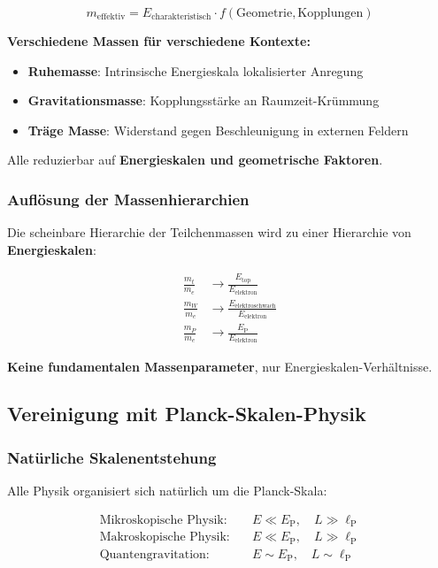 \documentclass[12pt,a4paper]{article}
\newcommand{\lP}{\ell_{\text{P}}}
\newcommand{\EP}{E_{\text{P}}}
\begin{document}
	\begin{equation}
		m_{\text{effektiv}} = E_{\text{charakteristisch}} \cdot f(\text{Geometrie}, \text{Kopplungen})
		\label{eq:emergent_mass}
	\end{equation}
	
	\textbf{Verschiedene Massen für verschiedene Kontexte:}
	\begin{itemize}
		\item \textbf{Ruhemasse}: Intrinsische Energieskala lokalisierter Anregung
		\item \textbf{Gravitationsmasse}: Kopplungsstärke an Raumzeit-Krümmung  
		\item \textbf{Träge Masse}: Widerstand gegen Beschleunigung in externen Feldern
	\end{itemize}
	
	Alle reduzierbar auf \textbf{Energieskalen und geometrische Faktoren}.
	
	\subsubsection{Auflösung der Massenhierarchien}
	
	Die scheinbare Hierarchie der Teilchenmassen wird zu einer Hierarchie von \textbf{Energieskalen}:
	
	\begin{align}
		\frac{m_t}{m_e} &\rightarrow \frac{E_{\text{top}}}{E_{\text{elektron}}} \\
		\frac{m_W}{m_e} &\rightarrow \frac{E_{\text{elektroschwach}}}{E_{\text{elektron}}} \\
		\frac{m_P}{m_e} &\rightarrow \frac{\EP}{E_{\text{elektron}}}
	\end{align}
	
	\textbf{Keine fundamentalen Massenparameter}, nur Energieskalen-Verhältnisse.
	
	\subsection{Vereinigung mit Planck-Skalen-Physik}
	\label{subsec:planck_unification}
	
	\subsubsection{Natürliche Skalenentstehung}
	
	Alle Physik organisiert sich natürlich um die Planck-Skala:
	
	\begin{align}
		\text{Mikroskopische Physik:} \quad &E \ll \EP, \quad L \gg \lP \\
		\text{Makroskopische Physik:} \quad &E \ll \EP, \quad L \gg \lP \\
		\text{Quantengravitation:} \quad &E \sim \EP, \quad L \sim \lP
	\end{align}
	
\end{document}

